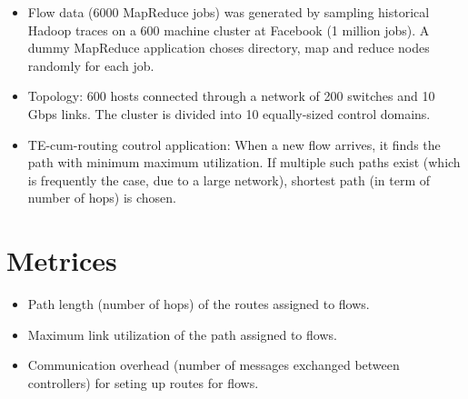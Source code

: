 \documentclass[a0,portrait]{a0poster}
\begin{document}
\begin{multicols}{2}
\begin{itemize}
\item Flow data (6000 MapReduce jobs) was generated by sampling historical Hadoop traces on a 600 machine cluster at Facebook (1 million jobs). A dummy MapReduce application choses directory, map and reduce nodes randomly for each job.
\item Topology: 600 hosts connected through a network of 200 switches and 10 Gbps links. The cluster is divided into 10 equally-sized control domains.
\item TE-cum-routing coutrol application: When a new flow arrives, it finds the path with minimum maximum utilization. If multiple such paths exist (which is frequently the case, due to a large network), shortest path (in term of number of hops) is chosen.
\end{itemize}

\section*{Metrices}
\begin{itemize}
\item Path length (number of hops) of the routes assigned to flows.
\item Maximum link utilization of the path assigned to flows.
\item Communication overhead (number of messages exchanged between controllers) for seting up routes for flows.   
\end{itemize}




\end{multicols}
\end{document}
